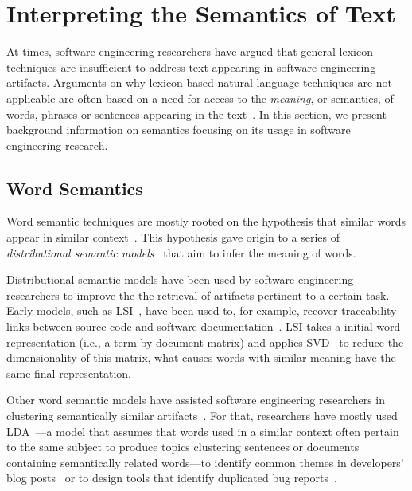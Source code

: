 

\section{Interpreting the Semantics of Text}
\label{cp2:artifact-semantics}







At times, software engineering researchers have argued
that general lexicon techniques 
are insufficient to address text appearing in
software engineering artifacts. 
Arguments on why lexicon-based natural 
language techniques are not applicable are often based
on a need for access to the \textit{meaning}, or semantics, 
of words, phrases or sentences appearing in the text~\cite{jurafsky2014speech}.
In this section, 
we present background information on semantics focusing on
its usage in software engineering research.



\subsection{Word Semantics}

Word semantic techniques are mostly rooted on the hypothesis
that similar words appear in similar context~\cite{harris1954distributional}.
This hypothesis gave origin to a series of
\textit{distributional semantic models}~\cite{Ye2016} that aim to infer the meaning of words.



Distributional semantic models have been used by software engineering researchers 
to improve the 
the retrieval of artifacts pertinent to a certain task. 
Early models, such as \acf{LSI}~\cite{deerwester1990LSI}, 
have been used to, for example, recover traceability links between source code and
software documentation~\cite{marcus2003}.  
\acs{LSI} takes a initial word representation (i.e., a term by document matrix) and applies \acf{SVD}~\cite{klema1980SVD}
to reduce the dimensionality of this matrix, what causes 
words with similar meaning have the same final representation.


Other word semantic models have assisted software engineering researchers in clustering semantically similar artifacts~\cite{zhang2014, layman2016}. For that, researchers have mostly used
\acf{LDA}~\cite{blei2003latent}---a model that assumes that words used in a similar context often pertain to the same subject to produce topics clustering sentences or documents containing semantically related words---to
identify common themes in developers' blog posts~\cite{Pagano2011} or to design tools that identify duplicated bug reports~\cite{nguyen2012, Thung2014}.


